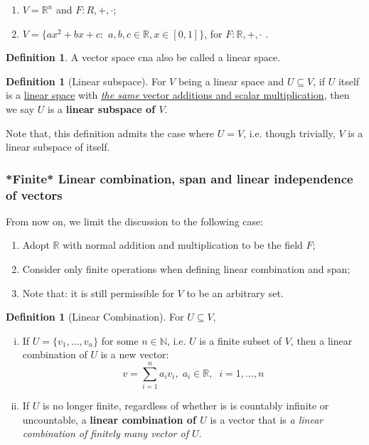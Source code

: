 \documentclass[12pt]{article}
\newcommand{\N}{{\mathbb N}}
\newcommand{\R}{{\mathbb R}}
\theoremstyle{definition}
\newtheorem{definition}[theorem]{Definition}
\theoremstyle{plain}
\begin{document}
\begin{example}
    \begin{enumerate}
        \item $V = \R^n$ and $F: R, +, \cdot$\quad ;
        \item $V = \{ax^2 + bx + c: $ $a, b, c\in \R, x \in [0,1]\}$, for $F:\R,
            +, \cdot$ \quad .
    \end{enumerate}
\end{example}

\begin{definition}
    A vector space cna also be called a linear space.
\end{definition}

\begin{definition}
    [Linear subspace]
    For $V$ being a linear space and $U\subseteq V$, if $U$ itself is a
    \underline{linear space} with \underline{\textit{the same} vector additions
    and scalar multiplication}, then we say $U$ is a \textbf{\small linear subspace of $V$}.

    Note that, this definition admits the case where $U = V$, i.e. though
    trivially, $V$ is a linear subspace of itself.
\end{definition}

\subsubsection{*Finite* Linear combination, span and linear independence of vectors}
From now on, we limit the discussion to the following case:
\begin{enumerate}
    \item Adopt $\R$ with normal addition and multiplication to be the field
        $F$;
    \item Consider only finite operations when defining linear combination and
        span;
    \item Note that: it is still permissible for $V$ to be an arbitrary set.
\end{enumerate}

\begin{definition}
    [Linear Combination] For $U \subseteq V$,
    \begin{enumerate}[(i)]
        \item If $U = \{v_1, \ldots, v_n\}$ for some $n \in \N$, i.e. $U$ is a finite subset of $V$,
            then a linear combination of $U$ is a new vector:
            \[
                v = \sum_{i=1}^n a_i v_i, \; a_i \in \R, \;\; i = 1, \ldots, n
            \]
        \item If $U$ is no longer finite, regardless of whether is is countably
            infinite or uncountable, a \textbf{linear combination of $U$} is a vector
            that is \textit{a linear combination of finitely many vector of $U$}.
    \end{enumerate}
\end{definition}
\end{document}
